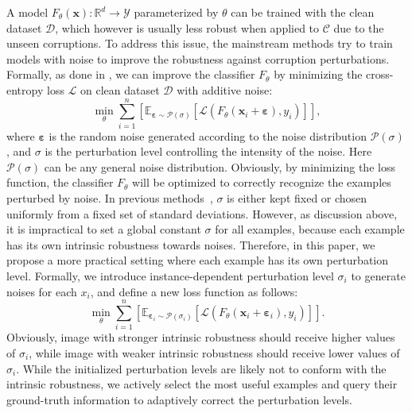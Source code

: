 \documentclass[letterpaper]{article} %
\begin{document}
A model $F_\theta(\mathbf{x}): \mathbb{R}^d \rightarrow \mathcal{Y}$ parameterized by $\theta$ can be trained with the clean dataset $\mathcal{D}$, which however is usually less robust when applied to $\mathcal{C}$ due to the unseen corruptions. To address this issue, the mainstream methods try to train models with noise to improve the robustness against corruption perturbations. Formally, as done in \cite{chapelle2001vicinal, gilmer2019adversarial, rusak2020increasing}, we can improve the classifier $F_\theta$ by minimizing the cross-entropy loss $\mathcal{L}$ on clean dataset $\mathcal{D}$ with additive noise:
\begin{equation}\label{EQ1}
\min _{\theta} \sum_{i=1}^{n}\left[\mathbb{E}_{\boldsymbol{\varepsilon} \sim \mathcal{P}(\sigma)}\left[\mathcal{L}\left(F_{\theta}\left(\mathbf{x}_{i}+\boldsymbol{\varepsilon}\right), y_{i}\right)\right]\right],
\end{equation}
where $\boldsymbol{\varepsilon}$ is the random noise generated according to the noise distribution $\mathcal{P}(\sigma)$, and $\sigma$ is the perturbation level controlling the intensity of the noise. Here $\mathcal{P}(\sigma)$ can be any general noise distribution. Obviously, by minimizing the loss function, the classifier $F_\theta$ will be optimized to correctly recognize the examples perturbed by noise. In previous methods~\cite{madry2017towards, rusak2020increasing, gilmer2019adversarial}, $\sigma$ is either kept fixed or chosen uniformly from a fixed set of standard deviations. However, as discussion above, it is impractical to set a global constant $\sigma$ for all examples, because each example has its own intrinsic robustness towards noises. Therefore, in this paper, we propose a more practical setting where each example has its own perturbation level. Formally, we introduce instance-dependent perturbation level $\sigma_i$ to generate noises for each $x_i$, and define a new loss function as follows:
\begin{equation}\label{EQ2}
\min _{\theta} \sum_{i=1}^{n}\left[\mathbb{E}_{\boldsymbol{\varepsilon}_{i} \sim \mathcal{P}\left(\sigma_{i}\right)}\left[\mathcal{L}\left(F_{\theta}\left(\mathbf{x}_{i}+\boldsymbol{\varepsilon}_{i}\right), y_{i}\right)\right]\right].
\end{equation}
Obviously, image with stronger intrinsic robustness should receive higher values of $\sigma_i$, while image with weaker intrinsic robustness should receive lower values of $\sigma_i$. While the initialized perturbation levels are likely not to conform with the intrinsic robustness, we actively select the most useful examples and query their ground-truth information to adaptively correct the perturbation levels.
\end{document}
